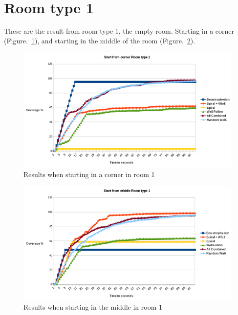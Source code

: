 \documentclass[bachelor]{kththesis}
\begin{document}
\section{Room type 1}
These are the result from room type 1, the empty room. Starting in a corner (Figure.~\ref{fig:corner1}), and starting in the middle of the room (Figure.~\ref{fig:middle1}).
\begin{figure}[H]
	\includegraphics[width=15cm]{img/cornerroom1chart.png}
	\centering
	\caption{Results when starting in a corner in room 1}
	\label{fig:corner1}
\end{figure}
\begin{figure}[H]
	\includegraphics[width=15cm]{img/middleroom1chart.png}
	\centering
	\caption{Results when starting in the middle in room 1}
	\label{fig:middle1}
\end{figure}
\end{document}
